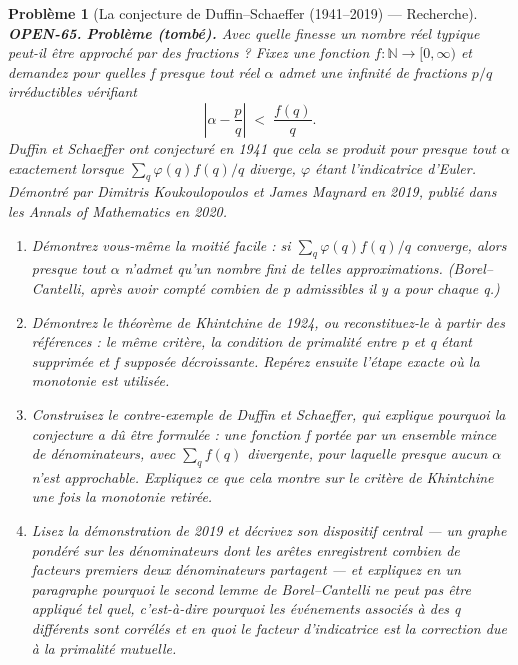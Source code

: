 \documentclass[11pt]{article}
\newtheorem{problem}{Problème}
\begin{document}
\begin{problem}[{La conjecture de Duffin--Schaeffer (1941--2019) --- Recherche}]
\textbf{OPEN-65.} \textbf{Problème (tombé).} Avec quelle finesse un nombre réel typique peut-il être
approché par des fractions ? Fixez une fonction $ f \colon \mathbb{N} \to [0, \infty) $
et demandez pour quelles f presque tout réel $\alpha$ admet une infinité de fractions $ p/q $
irréductibles vérifiant
\[ \left| \alpha - \frac{p}{q} \right| \;<\; \frac{f(q)}{q}. \]
Duffin et Schaeffer ont conjecturé en 1941 que cela se produit pour presque tout $\alpha$
exactement lorsque $ \sum_{q} \varphi(q) f(q)/q $ diverge, $\varphi$ étant l'indicatrice
d'Euler. Démontré par Dimitris Koukoulopoulos et James Maynard en 2019, publié dans les
\textit{Annals of Mathematics} en 2020.
\begin{enumerate}
\item[(a)] Démontrez vous-même la moitié facile : si $ \sum_q \varphi(q) f(q)/q $ converge,
alors presque tout $\alpha$ n'admet qu'un nombre fini de telles approximations. (Borel--Cantelli,
après avoir compté combien de p admissibles il y a pour chaque q.)
\item[(b)] Démontrez le théorème de Khintchine de 1924, ou reconstituez-le à partir des
références : le même critère, la condition de primalité entre p et q étant supprimée et f
supposée décroissante. Repérez ensuite l'étape exacte où la monotonie est utilisée.
\item[(c)] Construisez le contre-exemple de Duffin et Schaeffer, qui explique pourquoi la
conjecture a dû être formulée : une fonction f portée par un ensemble mince de
dénominateurs, avec $ \sum_q f(q) $ divergente, pour laquelle presque aucun $\alpha$ n'est
approchable. Expliquez ce que cela montre sur le critère de Khintchine une fois la
monotonie retirée.
\item[(d)] Lisez la démonstration de 2019 et décrivez son dispositif central --- un graphe pondéré
sur les dénominateurs dont les arêtes enregistrent combien de facteurs premiers deux
dénominateurs partagent --- et expliquez en un paragraphe pourquoi le second lemme de
Borel--Cantelli ne peut pas être appliqué tel quel, c'est-à-dire pourquoi les événements
associés à des q différents sont corrélés et en quoi le facteur d'indicatrice est la
correction due à la primalité mutuelle.
\end{enumerate}

\end{problem}
\end{document}
